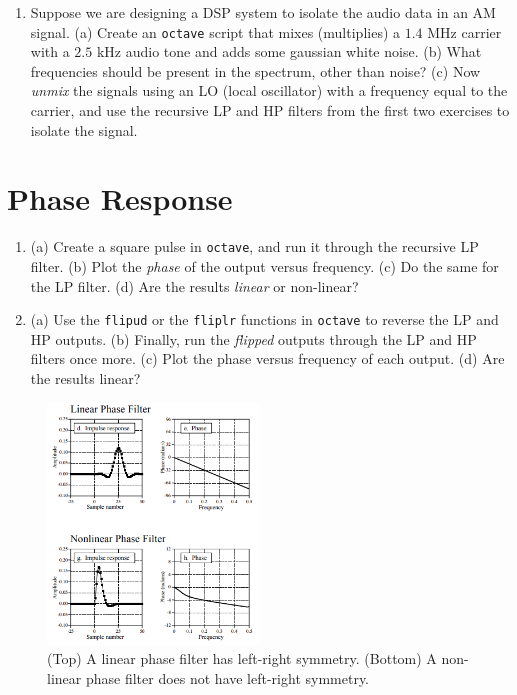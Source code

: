 \documentclass{article}
\begin{document}
\begin{enumerate}
\item Suppose we are designing a DSP system to isolate the audio data in an AM signal. (a) Create an \verb+octave+ script that mixes (multiplies) a $1.4$ MHz carrier with a $2.5$ kHz audio tone and adds some  gaussian white noise. (b) What frequencies should be present in the spectrum, other than noise? (c) Now \textit{unmix} the signals using an LO (local oscillator) with a frequency equal to the carrier, and use the recursive LP and HP filters from the first two exercises to isolate the signal.
\end{enumerate}

\section{Phase Response}

\begin{enumerate}
\item (a) Create a square pulse in \verb+octave+, and run it through the recursive LP filter. (b) Plot the \textit{phase} of the output versus frequency. (c) Do the same for the LP filter. (d) Are the results \textit{linear} or non-linear?
\item (a) Use the \verb+flipud+ or the \verb+fliplr+ functions in \verb+octave+ to reverse the LP and HP outputs.  (b) Finally, run the \textit{flipped} outputs through the LP and HP filters once more. (c)  Plot the phase versus frequency of each output. (d) Are the results linear?
\end{enumerate}

\begin{figure}
\centering
\includegraphics[width=0.5\textwidth]{phase_response.png}
\caption{\label{fig:1} (Top) A linear phase filter has left-right symmetry. (Bottom) A non-linear phase filter does not have left-right symmetry.}
\end{figure}
\end{document}
